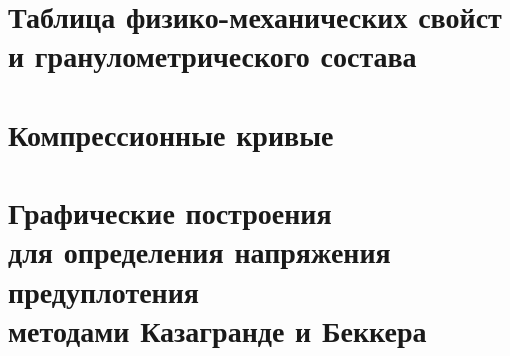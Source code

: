 \chapter{Таблица физико-механических свойст и гранулометрического состава}\label{app:tp}

\newpage

\newpage

\chapter{Компрессионные кривые}\label{app:ct}


\chapter{Графические построения \\ для определения напряжения предуплотения \\ методами Казагранде и Беккера}\label{app:methods}
